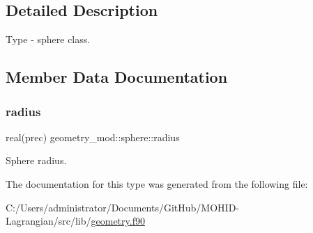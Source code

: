 \subsection{Detailed Description}
Type -\/ sphere class. 

\subsection{Member Data Documentation}
\mbox{\label{structgeometry__mod_1_1sphere_aea9381f351c3670047fb7a779ef44fd7}} 
\subsubsection{\texorpdfstring{radius}{radius}}
{\footnotesize\ttfamily real(prec) geometry\+\_\+mod\+::sphere\+::radius\hspace{0.3cm}{\ttfamily [private]}}



Sphere radius. 



The documentation for this type was generated from the following file\+:\begin{DoxyCompactItemize}
\item 
C\+:/\+Users/administrator/\+Documents/\+Git\+Hub/\+M\+O\+H\+I\+D-\/\+Lagrangian/src/lib/\hyperlink{geometry_8f90}{geometry.\+f90}\end{DoxyCompactItemize}

